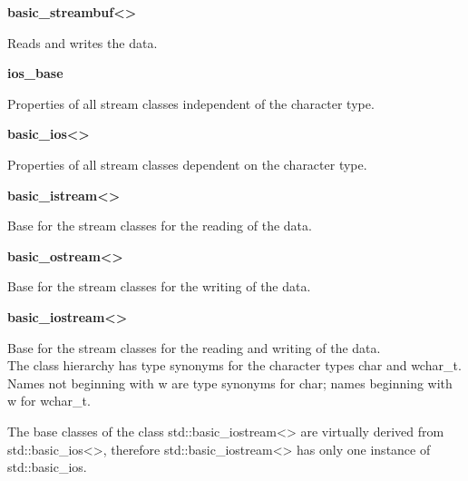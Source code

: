 


\noindent
\textbf{basic\_streambuf<>}

Reads and writes the data.

\noindent
\textbf{ios\_base}

Properties of all stream classes independent of the character type.

\noindent
\textbf{basic\_ios<>}

Properties of all stream classes dependent on the character type.

\noindent
\textbf{basic\_istream<>}

Base for the stream classes for the reading of the data.

\noindent
\textbf{basic\_ostream<>}

Base for the stream classes for the writing of the data.

\noindent
\textbf{basic\_iostream<>}

Base for the stream classes for the reading and writing of the data.\\

The class hierarchy has type synonyms for the character types char and wchar\_t. Names not beginning with w are type synonyms for char; names beginning with w for wchar\_t.

The base classes of the class std::basic\_iostream<> are virtually derived from std::basic\_ios<>, therefore std::basic\_iostream<> has only one instance of std::basic\_ios.






























